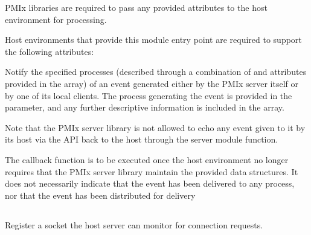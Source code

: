 \reqattrstart
\ac{PMIx} libraries are required to pass any provided attributes to the host environment for processing.

Host environments that provide this module entry point are required to support the following attributes:


\reqattrend

\descr

Notify the specified processes (described through a combination of  and attributes provided in the  array) of an event generated either by the \ac{PMIx} server itself or by one of its local clients.
The process generating the event is provided in the  parameter, and any further descriptive information is
included in the  array.

Note that the \ac{PMIx} server library is not allowed to echo any event given to it by its host via the  \ac{API} back to the host through the  server module function.

\advicermstart
The callback function is to be executed once the host environment no longer requires that the \ac{PMIx} server library maintain the provided data structures. It does not necessarily indicate that the event has been delivered to any process, nor that the event has been distributed for delivery
\advicermend


\subsection{}

\summary

Register a socket the host server can monitor for connection requests.

\format


